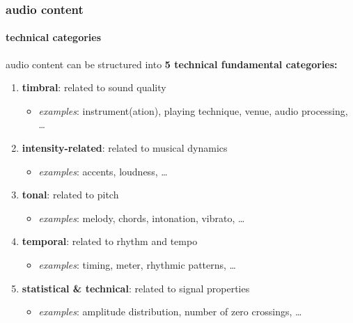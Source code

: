         \begin{frame}\frametitle{audio content}\framesubtitle{technical categories}
            audio content can be structured into \textbf{5 technical fundamental categories:}
            
            \bigskip
            \begin{enumerate}
                \item<2->	\textbf{timbral}: related to sound quality
                    \begin{itemize}
                        \item   \textit{examples}: instrument(ation), playing technique, venue, audio processing, \ldots
                    \end{itemize}
                \item<3->	\textbf{intensity-related}: related to musical dynamics
                    \begin{itemize}
                        \item   \textit{examples}: accents, loudness, \ldots
                    \end{itemize}
                \item<4->	\textbf{tonal}: related to pitch
                    \begin{itemize}
                        \item   \textit{examples}: melody, chords, intonation, vibrato, \ldots
                    \end{itemize}
                \item<5->	\textbf{temporal}: related to rhythm and tempo
                    \begin{itemize}
                        \item   \textit{examples}: timing, meter, rhythmic patterns, \ldots
                    \end{itemize}
                \item<6->	\textbf{statistical \& technical}: related to signal properties
                    \begin{itemize}
                        \item   \textit{examples}: amplitude distribution, number of zero crossings, \ldots
                    \end{itemize}
            \end{enumerate}
        \end{frame}

